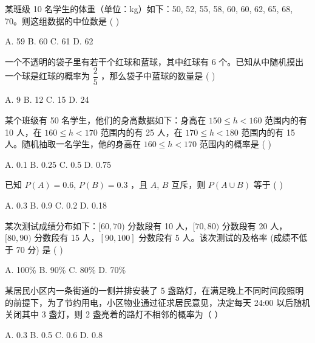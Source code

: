 \documentclass[11pt, a4paper]{article}
\begin{document}
\begin{baitap}[7]
某班级 10 名学生的体重（单位：kg）如下：50, 52, 55, 58, 60, 60, 62, 65, 68, 70。则这组数据的中位数是 ( )
\par\vspace{3pt}
\noindent A. 59 \quad B. 60 \quad C. 61 \quad D. 62
\end{baitap}

\begin{baitap}[8]
一个不透明的袋子里有若干个红球和蓝球，其中红球有 6 个。已知从中随机摸出一个球是红球的概率为 $\dfrac{2}{5}$ ，那么袋子中蓝球的数量是 ( )
\par\vspace{3pt}
\noindent A. 9 \quad B. 12 \quad C. 15 \quad D. 24
\end{baitap}

\begin{baitap}[9]
某个班级有 50 名学生，他们的身高数据如下：身高在 $150 \le h < 160$ 范围内的有 10 人，在 $160 \le h < 170$ 范围内的有 25 人，在 $170 \le h < 180$ 范围内的有 15 人。随机抽取一名学生，他的身高在 $160 \le h < 170$ 范围内的概率是 ( )
\par\vspace{3pt}
\noindent A. 0.1 \quad B. 0.25 \quad C. 0.5 \quad D. 0.75
\end{baitap}

\begin{baitap}[10]
已知 $P(A) = 0.6$, $P(B) = 0.3$ ，且 $A$, $B$ 互斥，则 $P(A \cup B)$ 等于 ( )
\par\vspace{3pt}
\noindent A. 0.3 \quad B. 0.9 \quad C. 0.2 \quad D. 0.18
\end{baitap}

\begin{baitap}[11]
某次测试成绩分布如下：$[60,70)$ 分数段有 10 人，$[70,80)$ 分数段有 20 人，$[80,90)$ 分数段有 15 人，$[90,100]$ 分数段有 5 人。该次测试的及格率 (成绩不低于 70 分) 是 ( )
\par\vspace{3pt}
\noindent A. 100\% \quad B. 90\% \quad C. 80\% \quad D. 70\%
\end{baitap}

\begin{baitap}[12]
某居民小区内一条街道的一侧并排安装了 5 盏路灯，在满足晚上不同时间段照明的前提下，为了节约用电，小区物业通过征求居民意见，决定每天 24:00 以后随机关闭其中 3 盏灯，则 2 盏亮着的路灯不相邻的概率为（ ）
\par\vspace{3pt}
\noindent A. 0.3 \quad B. 0.5 \quad C. 0.6 \quad D. 0.8
\end{baitap}
\end{document}
